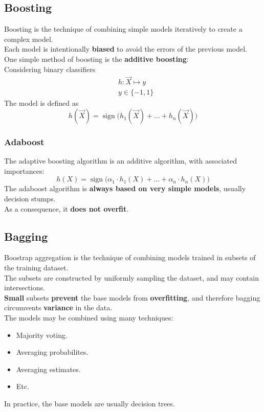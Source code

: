 \documentclass[11pt]{article}
\DeclareMathOperator{\sign}{sign}
\begin{document}
\subsection{Boosting}
\label{sec:org102a1da}
Boosting is the technique of combining simple models iteratively to create a complex
model. \\
Each model is intentionally \textbf{biased} to avoid the errors of the previous model. \\

One simple method of boosting is the \textbf{additive boosting}: \\
Considering binary classifiers
\begin{align*}
  & h: \vec{X} \mapsto y \\
  & y \in \{ -1, 1 \}
\end{align*}
The model is defined as
\[
h(\vec{X}) = \sign\big(h_1(\vec{X}) + \hdots + h_n(\vec{X})\big)
\]
\subsubsection{Adaboost}
\label{sec:org63722a9}
The adaptive boosting algorithm is an additive algorithm, with associated importances:
\[
  h(X) = \sign\big(\alpha_1 \cdot h_1(X) + \hdots + \alpha_n \cdot h_n(X)\big)
\]
The adaboost algorithm is \textbf{always based on very simple models}, usually decision
stumps. \\
As a consequence, it \textbf{does not overfit}.
\subsection{Bagging}
\label{sec:orgb57c293}
Boostrap aggregation is the technique of combining models trained in subsets of the
training dataset. \\
The subsets are constructed by uniformly sampling the dataset, and may contain
intersections. \\
\textbf{Small} subsets \textbf{prevent} the base models from \textbf{overfitting}, and therefore bagging
circumvents \textbf{variance} in the data. \\

The models may be combined using many techniques:
\begin{itemize}[itemsep=0pt]
\item Majority voting.
\item Averaging probabilites.
\item Averaging estimates.
\item Etc.
\end{itemize}
In practice, the base models are usually decision trees.
\end{document}
